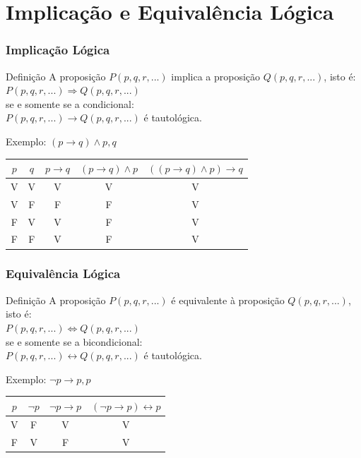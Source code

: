 \documentclass{beamer}
\begin{document}
\section{Implicação e Equivalência Lógica}

\begin{frame}
\frametitle{Implicação Lógica}

\begin{block}{Definição}
A proposição $P(p, q,r, . . .)$ implica a proposição $Q(p, q,r, . . .)$, isto é:\\
$P(p, q,r, . . .) \Rightarrow Q(p, q,r, . . .)$\\
se e somente se a condicional:\\
$P(p, q,r, . . .) \rightarrow Q(p, q,r, . . .)$
é tautológica.
\end{block}\vfill

\begin{exampleblock}{Exemplo: $(p \rightarrow q) \wedge p, q$}
	\center
	\begin{tabular}{|c|c|c|c|c|}
		\hline
		$p$ & $q$ &  $p \rightarrow q$ & $(p \rightarrow q) \wedge p$ & $((p \rightarrow q) \wedge p) \rightarrow q$ \\ \hline
		V & V  & V & V &V\\ \hline
		V & F  & F  & F & V\\ \hline
        F & V  & V & F & V\\ \hline
		F & F  & V  & F& V\\ \hline
	\end{tabular}
\end{exampleblock}\vfill

\end{frame}

\begin{frame}
\frametitle{Equivalência Lógica}

\begin{block}{Definição}
A proposição $P(p, q,r, . . .)$ é equivalente à proposição $Q(p, q,r, . . .)$, isto é:\\
$P(p, q,r, . . .) \Leftrightarrow Q(p, q,r, . . .)$\\
se e somente se a bicondicional:\\
$P(p, q,r, . . .) \leftrightarrow Q(p, q,r, . . .)$
é tautológica.
\end{block}\vfill

\begin{exampleblock}{Exemplo: $\neg p \rightarrow p, p$}
	\center
	\begin{tabular}{|c|c|c|c|}
		\hline
		$p$ & $\neg p$ &  $\neg p \rightarrow p$ & $(\neg p \rightarrow p) \leftrightarrow p$  \\ \hline
		V & F  & V & V \\ \hline
		F & V  & F  & V \\ \hline
	\end{tabular}
\end{exampleblock}\vfill

\end{frame}
\end{document}
